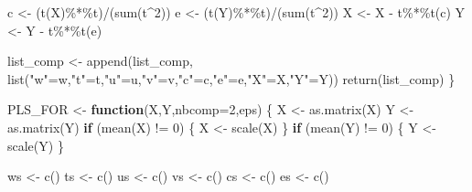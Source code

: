 \documentclass[
]{article}
\newenvironment{Shaded}{\begin{snugshade}}{\end{snugshade}}
\newcommand{\AttributeTok}[1]{\textcolor[rgb]{0.77,0.63,0.00}{#1}}
\newcommand{\ControlFlowTok}[1]{\textcolor[rgb]{0.13,0.29,0.53}{\textbf{#1}}}
\newcommand{\DecValTok}[1]{\textcolor[rgb]{0.00,0.00,0.81}{#1}}
\newcommand{\FunctionTok}[1]{\textcolor[rgb]{0.00,0.00,0.00}{#1}}
\newcommand{\NormalTok}[1]{#1}
\newcommand{\OtherTok}[1]{\textcolor[rgb]{0.56,0.35,0.01}{#1}}
\newcommand{\SpecialCharTok}[1]{\textcolor[rgb]{0.00,0.00,0.00}{#1}}
\newcommand{\StringTok}[1]{\textcolor[rgb]{0.31,0.60,0.02}{#1}}
\begin{document}
\begin{Shaded}
\begin{Highlighting}[]
\NormalTok{  c }\OtherTok{\textless{}{-}}\NormalTok{ (}\FunctionTok{t}\NormalTok{(X)}\SpecialCharTok{\%*\%}\NormalTok{t)}\SpecialCharTok{/}\NormalTok{(}\FunctionTok{sum}\NormalTok{(t}\SpecialCharTok{\^{}}\DecValTok{2}\NormalTok{))}
\NormalTok{  e }\OtherTok{\textless{}{-}}\NormalTok{ (}\FunctionTok{t}\NormalTok{(Y)}\SpecialCharTok{\%*\%}\NormalTok{t)}\SpecialCharTok{/}\NormalTok{(}\FunctionTok{sum}\NormalTok{(t}\SpecialCharTok{\^{}}\DecValTok{2}\NormalTok{))}
\NormalTok{  X }\OtherTok{\textless{}{-}}\NormalTok{ X }\SpecialCharTok{{-}}\NormalTok{ t}\SpecialCharTok{\%*\%}\FunctionTok{t}\NormalTok{(c)}
\NormalTok{  Y }\OtherTok{\textless{}{-}}\NormalTok{ Y }\SpecialCharTok{{-}}\NormalTok{ t}\SpecialCharTok{\%*\%}\FunctionTok{t}\NormalTok{(e)}
        
\NormalTok{  list\_comp }\OtherTok{\textless{}{-}} \FunctionTok{append}\NormalTok{(list\_comp, }
                      \FunctionTok{list}\NormalTok{(}\StringTok{"w"}\OtherTok{=}\NormalTok{w,}\StringTok{"t"}\OtherTok{=}\NormalTok{t,}\StringTok{"u"}\OtherTok{=}\NormalTok{u,}\StringTok{"v"}\OtherTok{=}\NormalTok{v,}\StringTok{"c"}\OtherTok{=}\NormalTok{c,}\StringTok{"e"}\OtherTok{=}\NormalTok{e,}\StringTok{"X"}\OtherTok{=}\NormalTok{X,}\StringTok{"Y"}\OtherTok{=}\NormalTok{Y))}
  \FunctionTok{return}\NormalTok{(list\_comp)}
\NormalTok{\} }

\NormalTok{PLS\_FOR }\OtherTok{\textless{}{-}} \ControlFlowTok{function}\NormalTok{(X,Y,}\AttributeTok{nbcomp=}\DecValTok{2}\NormalTok{,eps) \{}
\NormalTok{  X }\OtherTok{\textless{}{-}} \FunctionTok{as.matrix}\NormalTok{(X)}
\NormalTok{  Y }\OtherTok{\textless{}{-}} \FunctionTok{as.matrix}\NormalTok{(Y)}
  \ControlFlowTok{if}\NormalTok{ (}\FunctionTok{mean}\NormalTok{(X) }\SpecialCharTok{!=} \DecValTok{0}\NormalTok{) \{}
\NormalTok{    X }\OtherTok{\textless{}{-}} \FunctionTok{scale}\NormalTok{(X)}
\NormalTok{  \}}
  \ControlFlowTok{if}\NormalTok{ (}\FunctionTok{mean}\NormalTok{(Y) }\SpecialCharTok{!=} \DecValTok{0}\NormalTok{) \{}
\NormalTok{    Y }\OtherTok{\textless{}{-}} \FunctionTok{scale}\NormalTok{(Y)}
\NormalTok{  \}}

\NormalTok{  ws }\OtherTok{\textless{}{-}} \FunctionTok{c}\NormalTok{()}
\NormalTok{  ts }\OtherTok{\textless{}{-}} \FunctionTok{c}\NormalTok{()}
\NormalTok{  us }\OtherTok{\textless{}{-}} \FunctionTok{c}\NormalTok{()}
\NormalTok{  vs }\OtherTok{\textless{}{-}} \FunctionTok{c}\NormalTok{()}
\NormalTok{  cs }\OtherTok{\textless{}{-}} \FunctionTok{c}\NormalTok{()}
\NormalTok{  es }\OtherTok{\textless{}{-}} \FunctionTok{c}\NormalTok{()}


\end{Highlighting}
\end{Shaded}
\end{document}
